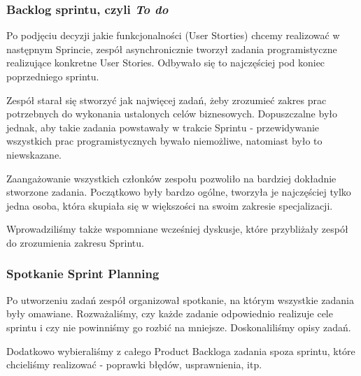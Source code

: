 \documentclass{article}
\begin{document}
\subsubsection*{Backlog sprintu, czyli \textit{To do}}
Po podjęciu decyzji jakie funkcjonalności (User Storties) chcemy realizować w następnym Sprincie, zespół asynchronicznie tworzył zadania programistyczne realizujące konkretne User Stories. Odbywało się to najczęściej pod koniec poprzedniego sprintu.

Zespół starał się stworzyć jak najwięcej zadań, żeby zrozumieć zakres prac potrzebnych do wykonania ustalonych celów biznesowych. Dopuszczalne było jednak, aby takie zadania powstawały w trakcie Sprintu - przewidywanie wszystkich prac programistycznych bywało niemożliwe, natomiast było to niewskazane.

Zaangażowanie wszystkich członków zespołu pozwoliło na bardziej dokładnie stworzone zadania. Początkowo były bardzo ogólne, tworzyła je najczęściej tylko jedna osoba, która skupiała się w większości na swoim zakresie specjalizacji.

Wprowadziliśmy także wspomniane wcześniej dyskusje, które przybliżały zespół do zrozumienia zakresu Sprintu.

\subsubsection*{Spotkanie Sprint Planning}
Po utworzeniu zadań zespół organizował spotkanie, na którym wszystkie zadania były omawiane. Rozważaliśmy, czy każde zadanie odpowiednio realizuje cele sprintu i czy nie powinniśmy go rozbić na mniejsze. Doskonaliliśmy opisy zadań.

Dodatkowo wybieraliśmy z całego Product Backloga zadania spoza sprintu, które chcieliśmy realizować - poprawki błędów, usprawnienia, itp.

\printbibliography[title={Bibliografia}]
\end{document}
